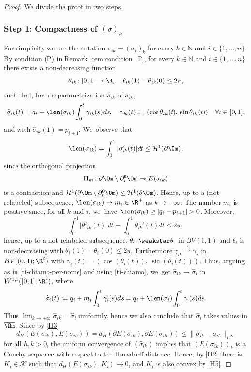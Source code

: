 \begin{proof}We divide the proof in two steps.\vspace*{-.5\baselineskip}

\subsubsection*{Step 1: Compactness of $(\sigma)_k$}
For simplicity we use the notation $\sigma_{ik} = (\sigma_i)_k$ for every $k\in
\mathbb N$ and $i\in\{1,\dots,n\}$.
By condition (P) in Remark \ref{rem:condition_P}, for every $k \in \mathbb N$ and $i\in\{1,\dots,n\}$
there exists a non-decreasing
function
\[
\theta_{ik}\colon[0,1]\to\R,\quad \theta_{ik}(1)-\theta_{ik}(0)\le2\pi,
\]
such that, for a reparametrization $\widehat \sigma_{ik}$ of $\sigma_{ik}$,
\begin{equation*}
\widehat\sigma_{ik}(t)=q_i+ \len(\sigma_{ik})\int_0^t\gamma_{ik}(s)ds,\quad \gamma_{ik}(t):=(\cos\theta_{ik}(t),\,\sin\theta_{ik}(t))
\quad\forall t\in[0,1],
\end{equation*}
and with $\widehat\sigma_{ik}(1)=p_{i+1}$. We~observe that
\begin{equation}\label{ti-chiamo}
\len(\sigma_{ik})=\int_0^1|\sigma_{ik}'(t)|dt\le\mathcal{H}^1(\partial\Om),
\end{equation}
since the orthogonal projection
\[
\Pi_{ki}\colon\partial\Om\setminus\partial^0_i\Om\to E(\sigma_{ik})
\]
is a contraction and $\mathcal{H}^1(\partial\Om\setminus\nobreak\partial^0_i\Om)\le \mathcal{H}^1(\partial\Om)$.
Hence, up to a (not relabeled) subsequence,
$\len(\sigma_{ik})\to m_i\in \R^+$ as $k \to +\infty$. The number $m_i$ is positive since, for all $k$ and $i$, we~have
$\len(\sigma_{ik})\geq |q_i-p_{i+1}|>0$.
Moreover,
\begin{equation*}
\int_0^1|\theta'_{ik}(t)|dt=\int_0^1\theta_{ik}'(t)dt\le2\pi;
\end{equation*}
hence, up to a not relabeled subsequence, $\theta_{ki}\weakstar\theta_i$ in $BV(0,1)$ and $\theta_i$ is non-decreasing with $\theta_i(1)-\theta_i(0)\le2\pi$. Furthermore $\gamma_{ik}\stackrel{*}{\rightharpoonup}\gamma_i$ in $BV((0,1);\R^2)$ with $\gamma_i(t)=(\cos(\theta_i(t)),\,\sin(\theta_i(t)))$. Thus, arguing as in \eqref{ti-chiamo-per-nome} and using \eqref{ti-chiamo}, we~get $\widehat\sigma_{ik}\to\widehat\sigma_i$ in $W^{1,1}([0,1];\R^2)$, where
\begin{equation}\label{sigmai}
\widehat\sigma_i(t):=q_i+m_i\int_0^t\gamma_i(s)ds=q_i+\len(\sigma_i)\int_0^t\gamma_i(s)ds.
\end{equation}
Thus $\lim_{k \to +\infty}\widehat\sigma_{ik}=\widehat\sigma_i$ uniformly, hence we also conclude that $\widehat\sigma_i$ takes values in $\overline\Om$.
Since by \ref{H3}
\[
d_H(E(\sigma_{ik}),E(\sigma_{ih}))=d_H(\partial E(\sigma_{ik}),\partial E(\sigma_{ih}))\leq \|\sigma_{ik}-\sigma_{ih}\|_{L^\infty}
\]
for all $h,k>0$,
the uniform convergence of $(\widehat\sigma_{ik})$ implies that $(E(\sigma_{ik}))_k$ is a Cauchy sequence with respect to the Hausdorff distance. Hence, by \ref{H2} there is $K_i\in\mathcal K$ such that $ d_H(E(\sigma_{ik}),K_i)\to0$, and $K_i$ is also convex by \ref{H5}.


\end{proof}
